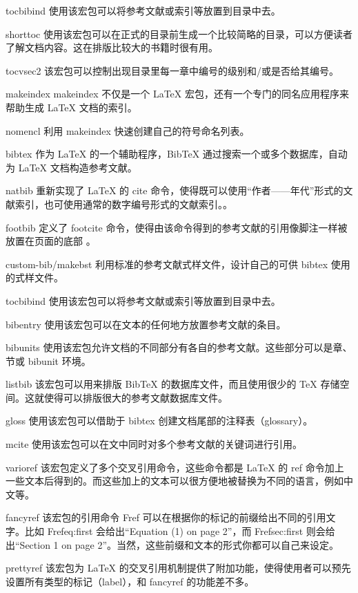 tocbibind
使用该宏包可以将参考文献或索引等放置到目录中去。
 
shorttoc
使用该宏包可以在正式的目录前生成一个比较简略的目录，可以方便读者了解文档内容。这在排版比较大的书籍时很有用。
 
tocvsec2
该宏包可以控制出现目录里每一章中编号的级别和/或是否给其编号。
 
makeindex
makeindex 不仅是一个 LaTeX 宏包，还有一个专门的同名应用程序来帮助生成 LaTeX 文档的索引。
 
nomencl
利用 makeindex 快速创建自己的符号命名列表。
 
bibtex
作为 LaTeX 的一个辅助程序，BibTeX 通过搜索一个或多个数据库，自动为 LaTeX 文档构造参考文献。
 
natbib
重新实现了 LaTeX 的 cite 命令，使得既可以使用“作者——年代”形式的文献索引，也可使用通常的数字编号形式的文献索引。。
 
footbib
定义了 footcite 命令，使得由该命令得到的参考文献的引用像脚注一样被放置在页面的底部 。
 
custom-bib/makebst
利用标准的参考文献式样文件，设计自己的可供 bibtex 使用的式样文件。
 
tocbibind
使用该宏包可以将参考文献或索引等放置到目录中去。
 
bibentry
使用该宏包可以在文本的任何地方放置参考文献的条目。
 
bibunits
使用该宏包允许文档的不同部分有各自的参考文献。这些部分可以是章、节或 bibunit 环境。
 
listbib
该宏包可以用来排版 BibTeX 的数据库文件，而且使用很少的 TeX 存储空间。这就使得可以排版很大的参考文献数据库文件。
 
gloss
使用该宏包可以借助于 bibtex 创建文档尾部的注释表（glossary）。
 
mcite
使用该宏包可以在文中同时对多个参考文献的关键词进行引用。
 
varioref
该宏包定义了多个交叉引用命令，这些命令都是 LaTeX 的 ref 命令加上一些文本后得到的。而这些加上的文本可以很方便地被替换为不同的语言，例如中文等。
 
fancyref
该宏包的引用命令 Fref 可以在根据你的标记的前缀给出不同的引用文字。比如 Fref{eq:first} 会给出“Equation (1) on page 2”，而 Fref{sec:first} 则会给出“Section 1 on page 2”。当然，这些前缀和文本的形式你都可以自己来设定。
 
prettyref
该宏包为 LaTeX 的交叉引用机制提供了附加功能，使得使用者可以预先设置所有类型的标记（label），和 fancyref 的功能差不多。
 
